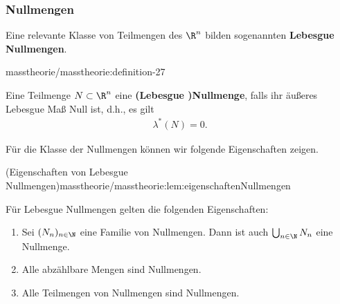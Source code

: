 \documentclass[letterpaper,10pt,english]{jupyterBook}
\begin{document}
\subsubsection{Nullmengen}
\label{\detokenize{masstheorie/masstheorie:nullmengen}}
\par
Eine relevante Klasse von Teilmengen des \(\R^n\) bilden sogenannten \textbf{Lebesgue Nullmengen}.
\begin{definition}{}{masstheorie/masstheorie:definition-27}



\par
Eine Teilmenge \(N \subset \R^n\) eine \textbf{(Lebesgue )Nullmenge}, falls ihr äußeres Lebesgue Maß Null ist, d.h., es gilt
\begin{align*}
\lambda^*(N) = 0.
\end{align*}\end{definition}

\par
Für die Klasse der Nullmengen können wir folgende Eigenschaften zeigen.
\begin{lemma}{(Eigenschaften von Lebesgue Nullmengen)}{masstheorie/masstheorie:lem:eigenschaftenNullmengen}



\par
Für Lebesgue Nullmengen gelten die folgenden Eigenschaften:
\begin{enumerate}

\item {} 
\par
Sei \((N_n)_{n\in\N}\) eine Familie von Nullmengen.
Dann ist auch \(\bigcup_{n\in\N} N_n\) eine Nullmenge.

\item {} 
\par
Alle abzählbare Mengen sind Nullmengen.

\item {} 
\par
Alle Teilmengen von Nullmengen sind Nullmengen.

\end{enumerate}
\end{lemma}
\end{document}
